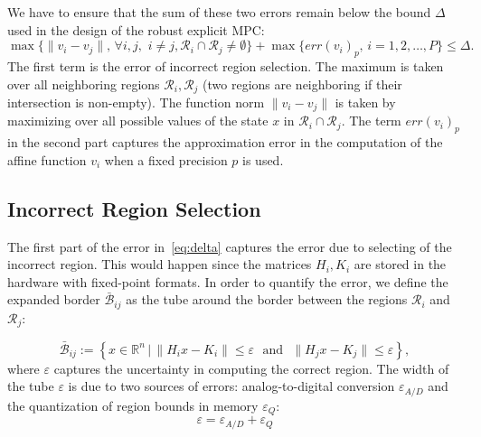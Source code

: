 We have to ensure that the sum of these two errors remain below the bound $\Delta$
used in the design of the robust explicit MPC:
\begin{equation}
  \max\{\|v_{i}-v_{j}\|,\,\forall i,j,\,\, i\neq j, \mathcal{R}_{i}\cap\mathcal{R}_{j}\neq\emptyset\} +  \max\{\mathit{err}(v_{i})_{p},\, i=1,2,\ldots,P\} \le \Delta.
  \label{eq:delta}
\end{equation}
The first term is the error of incorrect region selection. The maximum is taken over all neighboring regions 
$\mathcal R_i,\mathcal R_j$ (two regions are neighboring if their intersection is non-empty).
The function norm $\|v_{i}-v_{j}\|$ is taken by maximizing over all possible values of the state $x$ %
in $\mathcal{R}_i \cap \mathcal{R}_j$. %
The term $\mathit{err}(v_{i})_{p}$ in
the second part captures the approximation error in the computation of the affine function $v_{i}$ when a fixed precision $p$ is used.

\subsection{Incorrect Region Selection}

The first part of the error in~\autoref{eq:delta} captures the error due to
selecting of the incorrect region.
This would happen since the matrices $H_i,K_i$ are stored in the hardware with fixed-point formats. In order to quantify the error, we define the expanded border $\bar{\mathcal B}_{ij}$ as the tube around the border between the regions $\mathcal{R}_i$ and $\mathcal{R}_j$:

\begin{equation*}
\bar{\mathcal B}_{ij} := \left\{x\in\mathbb R^n\,|\, \| H_i x - K_i\| \le \varepsilon\,\, \text{ and }\,\, \| H_j x - K_j\| \le \varepsilon \right\},
\end{equation*}
where $\varepsilon$ captures the uncertainty in computing the correct region.
%
The width of the tube $\varepsilon$ is due to two sources of errors:
analog-to-digital conversion $\varepsilon_{A/D}$ and the quantization of region
bounds in memory $\varepsilon_{Q}$:
\begin{equation}\label{eq:epsilontot}
  \varepsilon=\varepsilon_{A/D}+\varepsilon_{Q}
\end{equation}

